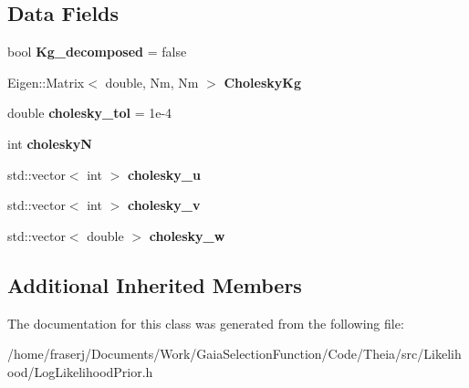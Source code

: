 \subsection*{Data Fields}
\begin{DoxyCompactItemize}
\item 
\mbox{\label{classLogLikelihoodPrior_a26006b4353f2d1983cfd936f1969953c}} 
bool {\bfseries Kg\+\_\+decomposed} = false
\item 
\mbox{\label{classLogLikelihoodPrior_a5b64d5b52eec4a6ab6b42345c77ba7f2}} 
Eigen\+::\+Matrix$<$ double, Nm, Nm $>$ {\bfseries Cholesky\+Kg}
\item 
\mbox{\label{classLogLikelihoodPrior_ac4567245e5f7eaa048016dbb3c7ebac4}} 
double {\bfseries cholesky\+\_\+tol} = 1e-\/4
\item 
\mbox{\label{classLogLikelihoodPrior_acb82f3170dc5ef9992ca3c0b1d451e08}} 
int {\bfseries choleskyN}
\item 
\mbox{\label{classLogLikelihoodPrior_aa0413d932c2bc78bde5b6b0d69efbaa3}} 
std\+::vector$<$ int $>$ {\bfseries cholesky\+\_\+u}
\item 
\mbox{\label{classLogLikelihoodPrior_a9ee359462c406bcd3e0a851eec71ba07}} 
std\+::vector$<$ int $>$ {\bfseries cholesky\+\_\+v}
\item 
\mbox{\label{classLogLikelihoodPrior_a4af02e24015068335bd22d870b0cfb32}} 
std\+::vector$<$ double $>$ {\bfseries cholesky\+\_\+w}
\end{DoxyCompactItemize}
\subsection*{Additional Inherited Members}


The documentation for this class was generated from the following file\+:\begin{DoxyCompactItemize}
\item 
/home/fraserj/\+Documents/\+Work/\+Gaia\+Selection\+Function/\+Code/\+Theia/src/\+Likelihood/Log\+Likelihood\+Prior.\+h\end{DoxyCompactItemize}
